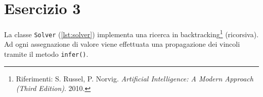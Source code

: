 \section{Esercizio 3}

La classe {\tt Solver} (\autoref{lst:solver}) implementa una ricerca in
backtracking\footnote{Riferimenti: S. Russel, P. Norvig. \emph{Artificial
Intelligence: A Modern Approach (Third Edition)}. 2010.} (ricorsiva). Ad ogni
assegnazione di valore viene effettuata una propagazione dei vincoli tramite il
metodo {\tt infer()}.


